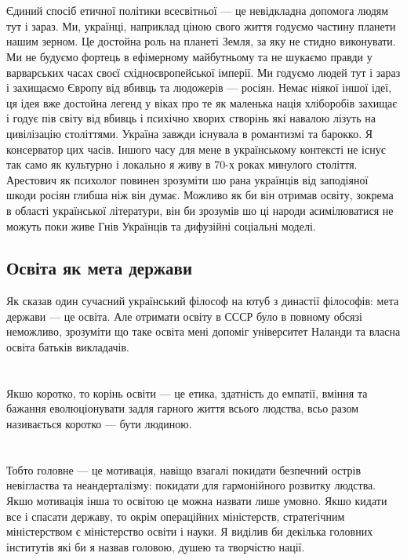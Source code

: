 \\
\\
Єдиний спосіб етичної політики всесвітньої — це невідкладна допомога людям тут і зараз. Ми, українці, наприклад ціною свого життя годуємо частину планети нашим зерном. Це достойна роль на планеті Земля, за яку не стидно виконувати. Ми не будуємо фортець в ефімерному майбутньому та не шукаємо правди у варварських часах своєї східноєвропейської імперії. Ми годуємо людей тут і зараз і захищаємо Європу від вбивць та людожерів — росіян. Немає ніякої іншої ідеї, ця ідея вже достойна легенд у віках про те як маленька нація хліборобів захищає і годує пів світу від вбивць і психічно хворих створінь які навалою лізуть на цивілізацію століттями. Україна завжди існувала в романтизмі та барокко. Я консерватор цих часів. Іншого часу для мене в українському контексті не існує так само як культурно і локально я живу в 70-х роках минулого століття. Арестович як психолог повинен зрозуміти шо рана українців від заподіяної шкоди росіян глибша ніж він думає. Можливо як би він отримав освіту, зокрема в області української літератури, він би зрозумів шо ці народи асимілюватися не можуть поки живе Гнів Українців та дифузійні соціальні моделі.\\

\subsection{Освіта як мета держави}

Як сказав один сучасний український філософ на ютуб з династії філософів: мета держави — це освіта. Але отримати освіту в СССР було в повному обсязі неможливо, зрозуміти що таке освіта мені допоміг університет Наланди та власна освіта батьків викладачів.\\
\\
\\
Якшо коротко, то корінь освіти — це етика, здатність до емпатії, вміння та бажання еволюціонувати задля гарного життя всього людства, всьо разом називається коротко — бути людиною.\\
\\
\\
Тобто головне — це мотивація, навіщо взагалі покидати безпечний острів невігластва та неандерталізму: покидати для гармонійного розвитку людства. Якшо мотивація інша то освітою це можна назвати лише умовно. Якшо кидати все і спасати державу, то окрім операційних міністерств, стратегічним міністерством є міністерство освіти і науки. Я виділив би декілька головних інститутів які би я назвав головою, душею та творчістю нації.\\
\\

